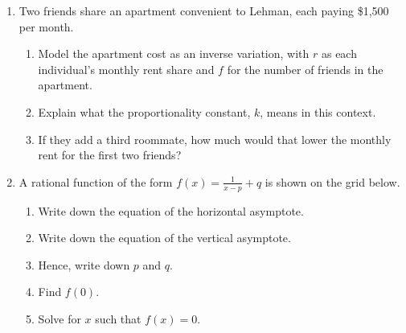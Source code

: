\documentclass[12pt, twoside]{article}
\begin{document}
\begin{enumerate}
\item Two friends share an apartment convenient to Lehman, each paying \$1,500 per month.
\begin{enumerate}[itemsep=1.25cm]
    \item Model the apartment cost as an inverse variation, with $r$ as each individual's monthly rent share and $f$ for the number of friends in the apartment.
    \item Explain what the proportionality constant, $k$, means in this context.
    \item If they add a third roommate, how much would that lower the monthly rent for the first two friends?
\end{enumerate}

\newpage
\item A rational function of the form $\displaystyle f(x)=\frac{1}{x-p}+q$ is shown on the grid below. 
    \begin{multicols}{2}
        \begin{enumerate}[itemsep=1cm]
            \item Write down the equation of the horizontal asymptote.
            \item  Write down the equation of the vertical asymptote.
            \item Hence, write down $p$ and $q$.
            \item Find $f(0)$.
            \item Solve for $x$ such that $f(x)=0$.
        \end{enumerate}
    \end{multicols}


\end{enumerate}
\end{document}
